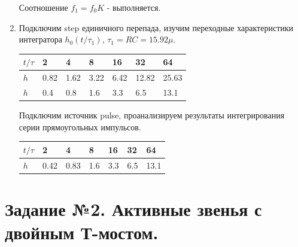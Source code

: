 \documentclass[12pt,a4paper]{article}
\begin{document}
\begin{enumerate}
\begin{table}[H]
\begin{tabular}{ |p{2cm}|p{1cm}|p{1cm}|p{1cm}|p{1cm}|p{1cm}|p{1cm}|}
    \end{tabular}
    \end{table}
    Соотношение $f_1 = f_0K$ - выполняется.
    
    \item Подключим step единичного перепада, изучим переходные характеристики интегратора $h_0(t/\tau_1)$, $\tau_1 = RC = 15.92\mu$.
    
    \begin{table}[H]
        \centering
        \begin{center}
        \end{center}
        \vspace{0.1cm}
        \label{tab:my_label}
        \begin{tabular}{ |p{2cm}|p{1.5cm}|p{3cm}|p{1.5cm}|p{2cm}|p{1cm}|p{1.3cm}|}
     \hline
    $t/\tau$ &  2 & 4 & 8 & 16 & 32 & 64 \\
    \hline
    $h$ &  0.82 & 1.62 & 3.22 & 6.42 & 12.82 & 25.63 \\
    \hline
    $h$ &   0.4  & 0.8 & 1.6 & 3.3 & 6.5 & 13.1 \\
    \hline

    \end{tabular}
    \end{table}
    Подключим источник pulse, проанализируем результаты интегрирования серии прямоугольных импульсов.

    \begin{table}[H]
        \centering
        \begin{center}
        \end{center}
        \vspace{0.1cm}
        \label{tab:my_label}
        \begin{tabular}{ |p{2cm}|p{1.5cm}|p{3cm}|p{1.5cm}|p{2cm}|p{1cm}|p{1.3cm}|}
     \hline
    $t/\tau$ &  2 & 4 & 8 & 16 & 32 & 64 \\
    \hline
    $h$ &  0.42 & 0.83 & 1.6 & 3.3 & 6.5 & 13.1 \\
    \hline
    \end{tabular}
    \end{table}
     

\end{enumerate}

\section{Задание №2. Активные звенья с двойным Т-мостом.}
\end{document}
